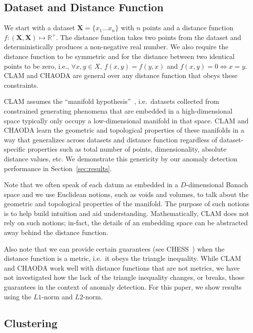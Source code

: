 \subsection{Dataset and Distance Function}
\label{subsec:methods:dataset-and-distance-function}

We start with a dataset $\textbf{X} = \{x_1 \dots x_n\}$ with $n$ points and a distance function $f : (\textbf{X}, \textbf{X}) \mapsto \mathbb{R}^+$.
The distance function takes two points from the dataset and deterministically produces a non-negative real number.
We also require the distance function to be symmetric and for the distance between two identical points to be zero, i.e., $\forall x, y \in X$, $f(x, y) = f(y, x)$ and $f(x, y) = 0 \Leftrightarrow x = y$.
CLAM and CHAODA are general over any distance function that obeys these constraints.

CLAM assumes the ``manifold hypothesis''~\cite{fefferman2016testing}, i.e.\ datasets collected from constrained generating phenomena that are embedded in a high-dimensional space typically only occupy a low-dimensional manifold in that space.
CLAM and CHAODA learn the geometric and topological properties of these manifolds in a way that generalizes across datasets and distance function regardless of dataset-specific properties such as total number of points, dimensionality, absolute distance values, etc.
We demonstrate this genericity by our anomaly detection performance in Section~\ref{sec:results}.

Note that we often speak of each datum as embedded in a $D$-dimensional Banach space and we use Euclidean notions, such as voids and volumes, to talk about the geometric and topological properties of the manifold.
The purpose of such notions is to help build intuition and aid understanding.
Mathematically, CLAM does not rely on such notions; in-fact, the details of an embedding space can be abstracted away behind the distance function.

Also note that we can provide certain guarantees (see CHESS~\cite{ishaq2019clustered}) when the distance function is a metric, i.e.\ it obeys the triangle inequality.
While CLAM and CHAODA work well with distance functions that are not metrics, we have not investigated how the lack of the triangle inequality changes, or breaks, those guarantees in the context of anomaly detection.
For this paper, we show results using the $L1$-norm and $L2$-norm.


\subsection{Clustering}
\label{subsec:methods:clustering}

